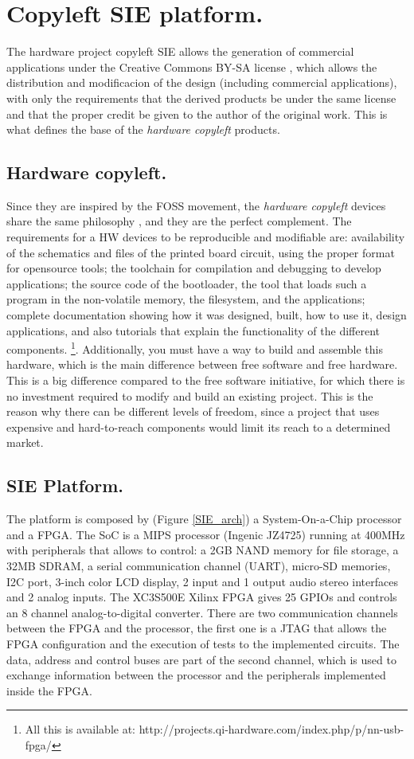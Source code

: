 \documentclass[runningheads,a4paper]{llncs}
\begin{document}
\section{Copyleft SIE platform.}

The hardware project copyleft SIE \cite{WSCC} allows the generation of commercial applications under the Creative Commons BY-SA license \cite{CCb}, which allows the distribution and modificacion of the design (including commercial applications), with only the requirements that the derived products be under the same license and that the proper credit be given to the author of the original work. This is what defines the base of the \textit{hardware copyleft} products.


\subsection{Hardware copyleft.}
Since they are inspired by the FOSS movement, the \textit{hardware copyleft} devices share the same philosophy \cite{RS07}, and they are the perfect complement. The requirements for a HW devices to be reproducible and modifiable are: availability of the schematics and files of the printed board circuit, using the proper format for opensource tools; the toolchain for compilation and debugging to develop applications; the source code of the bootloader, the tool that loads such a program in the non-volatile memory, the filesystem, and the applications; complete documentation showing how it was designed, built, how to use it, design applications, and also tutorials that explain the functionality of the different components. \footnote{All this is available at: http://projects.qi-hardware.com/index.php/p/nn-usb-fpga/}. Additionally, you must have a way to build and assemble this hardware, which is the main difference between free software and free hardware. This is a big difference compared to the free software initiative, for which there is no investment required to modify and build an existing project. This is the reason why there can be different levels of freedom, since a project that uses expensive and hard-to-reach components would limit its reach to a determined market.


\subsection{SIE Platform.}
The platform is composed by (Figure \ref{SIE_arch}) a System-On-a-Chip processor and a FPGA. The SoC is a MIPS processor (Ingenic JZ4725) running at 400MHz with peripherals that allows to control: a 2GB NAND memory for file storage, a 32MB SDRAM, a serial communication channel (UART), micro-SD memories, I2C port, 3-inch color LCD display, 2 input and 1 output audio stereo interfaces and 2 analog inputs. The XC3S500E Xilinx FPGA gives 25 GPIOs and controls an 8 channel analog-to-digital converter. There are two communication channels between the FPGA and the processor, the first one is a JTAG that allows the FPGA configuration and the execution of tests to the implemented circuits. The data, address and control buses are part of the second channel, which is used to exchange information between the processor and the peripherals implemented inside the FPGA.
\end{document}
